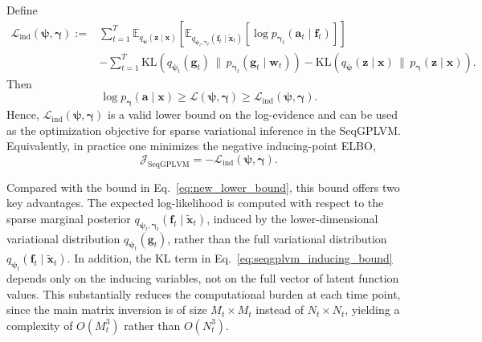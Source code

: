 Define
\begin{align}
\mathcal{L}_{\mathrm{ind}}(\boldsymbol{\psi},\boldsymbol{\gamma})
:=
&\sum_{t=1}^T
\mathbb{E}_{q_{\boldsymbol{\psi}}(\mathbf{z}\mid \mathbf{x})}
\!\left[
\mathbb{E}_{q_{\boldsymbol{\psi}_t,\boldsymbol{\gamma}_t}(\mathbf{f}_t\mid \widetilde{\mathbf{x}}_t)}
\!\left[
\log p_{\boldsymbol{\gamma}_t}(\mathbf{a}_t\mid \mathbf{f}_t)
\right]
\right]
\nonumber\\
&-
\sum_{t=1}^T
\mathrm{KL}\!\left(
q_{\boldsymbol{\psi}_t}(\mathbf{g}_t)
\,\big\|\,
p_{\boldsymbol{\gamma}_t}(\mathbf{g}_t\mid \mathbf{w}_t)
\right)
-
\mathrm{KL}\!\left(
q_{\boldsymbol{\psi}}(\mathbf{z}\mid \mathbf{x})
\,\big\|\,
p_{\boldsymbol{\gamma}}(\mathbf{z}\mid \mathbf{x})
\right).
\label{eq:inducing_elbo_def}
\end{align}
Then
\begin{equation}
\log p_{\boldsymbol{\gamma}}(\mathbf{a}\mid \mathbf{x})
\ge
\mathcal{L}(\boldsymbol{\psi},\boldsymbol{\gamma})
\ge
\mathcal{L}_{\mathrm{ind}}(\boldsymbol{\psi},\boldsymbol{\gamma}).
\label{eq:inducing_final_bound}
\end{equation}
Hence, \(\mathcal{L}_{\mathrm{ind}}(\boldsymbol{\psi},\boldsymbol{\gamma})\) is a valid
lower bound on the log-evidence and can be used as the optimization objective
for sparse variational inference in the SeqGPLVM. Equivalently, in practice one
minimizes the negative inducing-point ELBO,
\[
\mathcal{J}_{\mathrm{SeqGPLVM}}
=
-\mathcal{L}_{\mathrm{ind}}(\boldsymbol{\psi},\boldsymbol{\gamma}).
\]

Compared with the bound in Eq.~\eqref{eq:new_lower_bound}, 
this bound offers two key advantages. The expected log-likelihood is 
computed with respect to the sparse marginal posterior 
\(q_{\boldsymbol{\psi}_t,\boldsymbol{\gamma}_t}(\mathbf{f}_t \mid \widetilde{\mathbf{x}}_t)\), 
induced by the lower-dimensional variational distribution 
\(q_{\boldsymbol{\psi}_t}(\mathbf{g}_t)\), rather than the 
full variational distribution 
\(q_{\boldsymbol{\psi}_t}(\mathbf{f}_t \mid \widetilde{\mathbf{x}}_t)\). 
In addition, the KL term in Eq.~\eqref{eq:seqgplvm_inducing_bound} 
depends only on the inducing variables, not on the full vector of 
latent function values. This substantially reduces the computational burden at each time point, 
since the main matrix inversion is of size \(M_t \times M_t\) instead 
of \(N_t \times N_t\), yielding a complexity of \(O(M_t^3)\) rather than \(O(N_t^3)\). 

